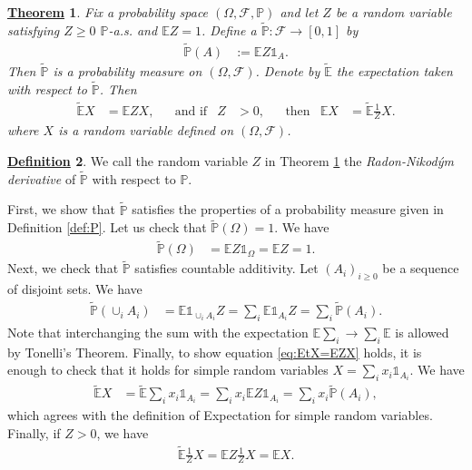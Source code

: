 \documentclass[12pt]{book}
\numberwithin{equation}{chapter}
\theoremstyle{plain}
\newtheorem{theorem}{\underline{Theorem}}
\numberwithin{theorem}{section}
\theoremstyle{definition}
\newtheorem{definition}[theorem]{\underline{Definition}}
\numberwithin{exercise}{chapter}
\let\oldendproof\endproof
\renewenvironment{proof}[1][\proofname]{%
  \oldproof[\scshape\underline{#1}]%
}{\oldendproof}
\newcommand{\<}{\langle}
\renewcommand{\>}{\rangle}
\renewcommand{\(}{\left(}
\renewcommand{\)}{\right)}
\renewcommand{\[}{\left[}
\renewcommand{\]}{\right]}
\newcommand\Eb{\mathds{E}}
\newcommand\Ib{\mathds{1}} 	%
\newcommand\Pb{\mathds{P}}
\newcommand\Fc{\mathscr{F}}
\newcommand\om{\omega}
\newcommand\Om{\Omega}
\newcommand\Ebt{\widetilde{\Eb}}
\newcommand\Pbt{\widetilde{\Pb}}
\newcommand\dd{\mathrm{d}}
\begin{document}
\begin{theorem}
\label{thm:measure.change}
Fix a probability space $(\Om,\Fc,\Pb)$ and let $Z$ be a random variable satisfying $Z \geq 0$ $\Pb$-a.s. and $\Eb Z = 1$.  
Define a $\Pbt : \Fc \to [0,1]$ by
\begin{align}
\Pbt(A)
	&:=	\Eb Z \Ib_A . \label{eq:PtA=EZIA}
\end{align}
Then $\Pbt$ is a probability measure on $(\Om,\Fc)$.  Denote by $\Ebt$ the expectation taken with respect to $\Pbt$.  Then
\begin{align}
\Ebt X
	&=	\Eb Z X , &
	&\text{and if}&
Z
	&>	0 , &
	&\text{then}&
\Eb X
	&=	\Ebt \frac{1}{Z} X . \label{eq:EtX=EZX}
\end{align}
where $X$ is a random variable defined on $(\Om,\Fc)$.
\end{theorem}
\begin{definition}
We call the random variable $Z$ in Theorem \ref{thm:measure.change} the \emph{Radon-Nikod\'ym derivative} of $\Pbt$ with respect to $\Pb$.
\end{definition}
\begin{proof}[Proof of Theorem \ref{thm:measure.change}]
First, we show that $\Pbt$ satisfies the properties of a probability measure given in Definition \ref{def:P}.  Let us check that $\Pbt(\Om) = 1$.  We have
\begin{align}
\Pbt(\Om)
	&=	\Eb Z \Ib_\Om
	=		\Eb Z
	=		1.
\end{align}
Next, we check that $\Pbt$ satisfies countable additivity.  Let $(A_i)_{i \geq 0}$ be a sequence of disjoint sets.  We have
\begin{align}
\Pbt(\cup_i A_i)
	&=	\Eb \Ib_{\cup_i A_i} Z
	=		\sum_i \Eb \Ib_{A_i} Z
	=		\sum_i \Pbt( A_i ) .
\end{align}
Note that interchanging the sum with the expectation $\Eb \sum_i \to \sum_i \Eb$ is allowed by Tonelli's Theorem.  Finally, to show equation \eqref{eq:EtX=EZX} holds, it is enough to check that it holds for simple random variables $X = \sum_i x_i \Ib_{A_i}$.  We have
\begin{align}
\Ebt X
	&=	\Ebt \sum_i x_i \Ib_{A_i}
	=		\sum_i x_i \Eb Z \Ib_{A_i}
	=		\sum_i x_i \Pbt(A_i) , 
\end{align}
which agrees with the definition of Expectation for simple random variables.  Finally, if $Z>0$, we have
\begin{align}
\Ebt \frac{1}{Z} X
	=		\Eb Z \frac{1}{Z} X
	=		\Eb X .
\end{align}
\end{proof}
\end{document}
